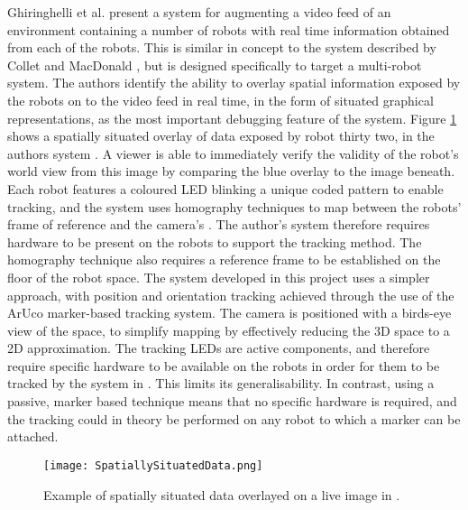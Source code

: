 Ghiringhelli et al. \cite{Ghiringhelli:2014} present a system for augmenting a video feed of an environment containing a number of robots with real time information obtained from each of the robots. This is similar in concept to the system described by Collet and MacDonald \cite{Collet:2006}, but is designed specifically to target a multi-robot system. The authors identify the ability to overlay spatial information exposed by the robots on to the video feed in real time, in the form of situated graphical representations, as the most important debugging feature of the system. Figure \ref{fig:SpatiallySituated} shows a spatially situated overlay of data exposed by robot thirty two, in the authors system \cite{Ghiringhelli:2014}. A viewer is able to immediately verify the validity of the robot's world view from this image by comparing the blue overlay to the image beneath. Each robot features a coloured LED blinking a unique coded pattern to enable tracking, and the system uses homography techniques to map between the robots' frame of reference and the camera's \cite{Ghiringhelli:2014}. The author's system therefore requires hardware to be present on the robots to support the tracking method. The homography technique also requires a reference frame to be established on the floor of the robot space. The system developed in this project uses a simpler approach, with position and orientation tracking achieved through the use of the ArUco \cite{Garrido:2014} marker-based tracking system. The camera is positioned with a birds-eye view of the space, to simplify mapping by effectively reducing the 3D space to a 2D approximation. The tracking LEDs are active components, and therefore require specific hardware to be available on the robots in order for them to be tracked by the system in \cite{Ghiringhelli:2014}. This limits its generalisability. In contrast, using a passive, marker based technique means that no specific hardware is required, and the tracking could in theory be performed on any robot to which a marker can be attached.

\begin{figure}
	\begin{center}
	\texttt{[image: SpatiallySituatedData.png]}
	\decoRule
	\caption[Spatially situation data overlay. Garrido et al. \cite{Ghiringhelli:2014}]{Example of spatially situated data overlayed on a live image in \cite{Ghiringhelli:2014}.}
	\label{fig:SpatiallySituated}
	\end{center}
\end{figure}


